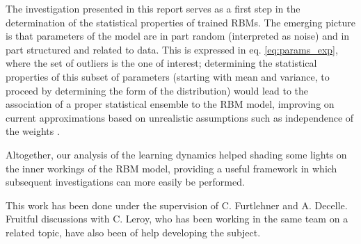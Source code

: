 \documentclass[notitlepage]{revtex4-1}
\begin{document}
The investigation presented in this report serves as a first step in the determination of the statistical properties of trained RBMs. The emerging picture is that parameters of the model are in part random (interpreted as noise) and in part structured and related to data. This is expressed in eq. \eqref{eq:params_exp}, where the set of outliers is the one of interest; determining the statistical properties of this subset of parameters (starting with mean and variance, to proceed by determining the form of the distribution) would lead to the association of a proper statistical ensemble to the RBM model, improving on current approximations based on unrealistic assumptions such as independence of the weights \cite{monasson}.

Altogether, our analysis of the learning dynamics helped shading some lights on the inner workings of the RBM model, providing a useful framework in which subsequent investigations can more easily be performed.

\begin{acknowledgements}
This work has been done under the supervision of C. Furtlehner and A. Decelle. Fruitful discussions with C. Leroy, who has been working in the same team on a related topic, have also been of help developing the subject.
\end{acknowledgements}


\end{document}
